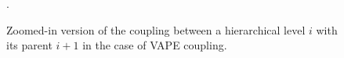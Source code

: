 \begin{figure}
  \centering

  \small

  \newcommand{\w}[1]{\textcolor{white}{#1}}
  \def\svgwidth{0.9\textwidth}


  \caption{Zoomed-in version of the coupling between a hierarchical level $i$ with its parent $i+1$ in the case of \textsf{VAPE} coupling.}.
  \label{\figlabel}
\end{figure}
